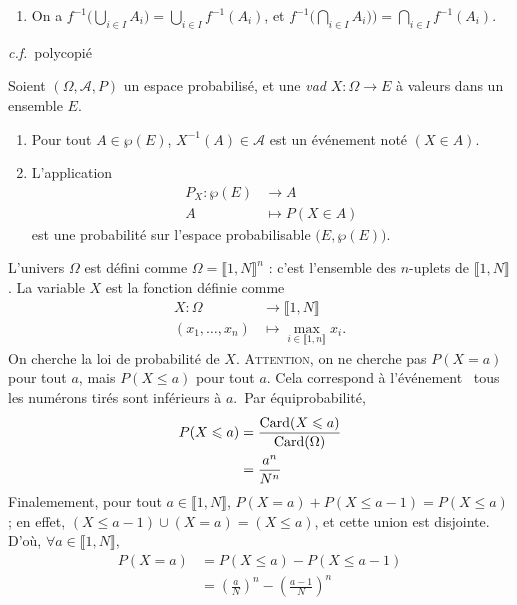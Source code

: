 \begin{rmk}
  \begin{enumerate}
    \item On a $f^{-1}\Big(\bigcup_{i \in I} A_{i}\Big) = \bigcup_{i \in I} f^{-1}(A_{i})$, et $f^{-1}\Big(\bigcap_{i \in I} A_{i})\Big) = \bigcap_{i \in I} f^{-1}(A_{i})$.
  \end{enumerate}
\end{rmk}

\begin{exm}
  \textit{c.f.}\ polycopié
\end{exm}

\begin{prop-defn}
  Soient $(\Omega,\mathcal{A},P)$ un espace probabilisé, et une \textit{vad} $X: \Omega \to E$ à valeurs dans un ensemble $E$.
  \begin{enumerate}
    \item Pour tout $A \in \wp(E)$, $X^{-1}(A) \in \mathcal{A}$ est un événement noté $(X \in A)$.
    \item L'application \begin{align*}
            P_{X} : \wp(E) &\longrightarrow A\\
            A & \longmapsto P(X \in A)
          \end{align*} est une probabilité sur l'espace probabilisable $\big(E, \wp(E)\big)$.
  \end{enumerate}
\end{prop-defn}

\begin{exo}
  L'univers $\Omega$ est défini comme $\Omega = \llbracket 1, N \rrbracket^{n}$ : c'est l'ensemble des $n$-uplets de $\llbracket 1, N \rrbracket$. La variable $X$ est la fonction définie comme
  \begin{align*}
    X : \Omega &\longrightarrow \llbracket 1, N\rrbracket\\
    (x_{1}, \ldots, x_{n}) &\longmapsto \max_{i \in \llbracket 1,n \rrbracket} x_{i}.
  \end{align*}
  On cherche la loi de probabilité de $X$.
  \textsc{Attention}, on ne cherche pas $P(X = a)$ pour tout $a$, mais $P(X \le a)$ pour tout $a$. Cela correspond à l'événement \guillemotleft~tous les numérons tirés sont inférieurs à $a$.~\guillemotright\@ Par équiprobabilité,
  \begin{align*}
    P(X \leqslant a) &= \frac{\operatorname{Card} (X \leqslant a)}{\operatorname{Card}(\Omega)}\\
    &= \frac{a^{n}}{N^{n}}
  \end{align*}
  Finalemement, pour tout $a \in \llbracket 1, N\rrbracket$, $P(X = a) + P(X \le a -1) = P(X \le a)$ ; en effet, $(X \le a - 1) \cup (X = a) = (X \le a)$, et cette union est disjointe.
  D'où, $\forall a \in \llbracket 1, N\rrbracket$,
  \begin{align*}
    P(X = a) &= P(X \le a) - P(X \le a - 1)\\
    &= \left(\frac{a}{N} \right)^{n} - \left(\frac{a - 1}{N} \right)^{n}
  \end{align*}
\end{exo}

